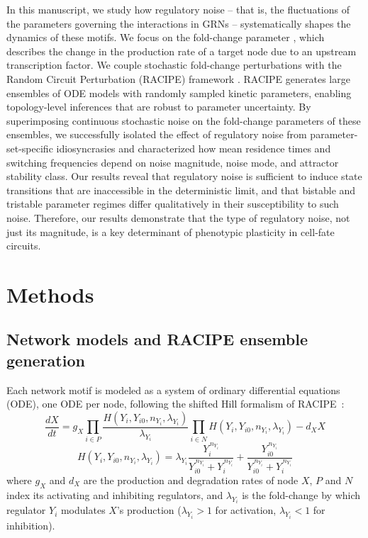 \documentclass[11pt]{article}
\begin{document}
In this manuscript, we study how regulatory noise – that is, the fluctuations of the parameters governing the interactions in GRNs – systematically shapes the dynamics of these motifs. We focus on the fold-change parameter \cite{Huang2017}, which describes the change in the production rate of a target node due to an upstream transcription factor. We couple stochastic fold-change perturbations with the Random Circuit Perturbation (RACIPE) framework \cite{Huang2017}. RACIPE generates large ensembles of ODE models with randomly sampled kinetic parameters, enabling topology-level inferences that are robust to parameter uncertainty. By superimposing continuous stochastic noise on the fold-change parameters of these ensembles, we successfully isolated the effect of regulatory noise from parameter-set-specific idiosyncrasies and characterized how mean residence times and switching frequencies depend on noise magnitude, noise mode, and attractor stability class. Our results reveal that regulatory noise is sufficient to induce state transitions that are inaccessible in the deterministic limit, and that bistable and tristable parameter regimes differ qualitatively in their susceptibility to such noise. Therefore, our results demonstrate that the type of regulatory noise, not just its magnitude, is a key determinant of phenotypic plasticity in cell-fate circuits.

\section{Methods}

\subsection{Network models and RACIPE ensemble generation}\label{sec:RACIPE}

Each network motif is modeled as a system of ordinary differential equations (ODE), one ODE per node, following the shifted Hill formalism of RACIPE~\cite{Huang2017}:
\begin{equation}
\frac{dX}{dt} = g_X \prod_{i \in P} \frac{H(Y_i, Y_{i0}, n_{Y_i}, \lambda_{Y_i})}{\lambda_{Y_i}} \prod_{i \in N} H(Y_i, Y_{i0}, n_{Y_i}, \lambda_{Y_i}) - d_X X
\label{eq:odeM}
\end{equation}
\begin{equation}
H(Y_i, Y_{i0}, n_{Y_i}, \lambda_{Y_i}) = \lambda_{Y_i} \frac{Y_i^{\,n_{Y_i}}}{Y_{i0}^{\,n_{Y_i}} + Y_i^{\,n_{Y_i}}} + \frac{Y_{i0}^{\,n_{Y_i}}}{Y_{i0}^{\,n_{Y_i}} + Y_i^{\,n_{Y_i}}}
\label{eq:hillM}
\end{equation}
where $g_X$ and $d_X$ are the production and degradation rates of node $X$, $P$ and $N$ index its activating and inhibiting regulators, and $\lambda_{Y_i}$ is the fold-change by which regulator $Y_i$ modulates $X$'s production ($\lambda_{Y_i} > 1$ for activation, $\lambda_{Y_i} < 1$ for inhibition).
\end{document}
